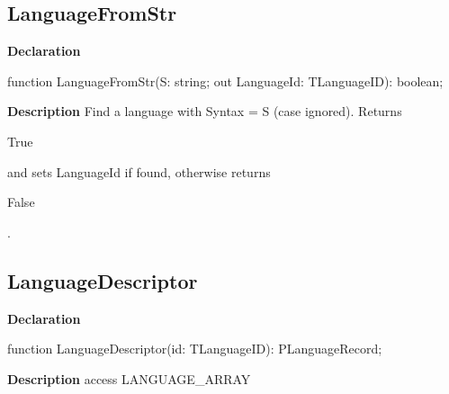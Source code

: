 \documentclass{report}
\newif\ifpdf
\begin{document}
\subsection*{LanguageFromStr}
\fi
\label{PasDoc_Languages-LanguageFromStr}
\begin{list}{}{
\setlength{\itemindent}{0cm}
\setlength{\listparindent}{0cm}
\setlength{\leftmargin}{\evensidemargin}
\addtolength{\leftmargin}{\tmplength}
\settowidth{\labelsep}{X}
\addtolength{\leftmargin}{\labelsep}
\setlength{\labelwidth}{\tmplength}
}
\item[\textbf{Declaration}\hfill]
\ifpdf
\begin{flushleft}
\fi
\begin{ttfamily}
function LanguageFromStr(S: string; out LanguageId: TLanguageID): boolean;\end{ttfamily}

\ifpdf
\end{flushleft}
\fi

\par
\item[\textbf{Description}]
Find a language with Syntax = S (case ignored). Returns \begin{ttfamily}True\end{ttfamily} and sets LanguageId if found, otherwise returns \begin{ttfamily}False\end{ttfamily}.

\end{list}
\ifpdf
\subsection*{\large{\textbf{LanguageDescriptor}}\normalsize\hspace{1ex}\hrulefill}
\else
\subsection*{LanguageDescriptor}
\fi
\label{PasDoc_Languages-LanguageDescriptor}
\begin{list}{}{
\setlength{\itemindent}{0cm}
\setlength{\listparindent}{0cm}
\setlength{\leftmargin}{\evensidemargin}
\addtolength{\leftmargin}{\tmplength}
\settowidth{\labelsep}{X}
\addtolength{\leftmargin}{\labelsep}
\setlength{\labelwidth}{\tmplength}
}
\item[\textbf{Declaration}\hfill]
\ifpdf
\begin{flushleft}
\fi
\begin{ttfamily}
function LanguageDescriptor(id: TLanguageID): PLanguageRecord;\end{ttfamily}

\ifpdf
\end{flushleft}
\fi

\par
\item[\textbf{Description}]
access LANGUAGE{\_}ARRAY

\end{list}
\ifpdf
\end{document}
